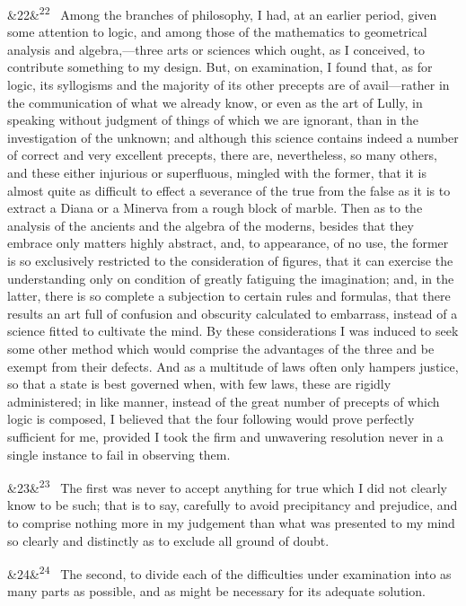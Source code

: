\documentclass[12pt]{article}
\newcommand{\para}[1][]{\par\noindent\ifx&#1&\else\textsuperscript{\footnotesize #1}~\fi}
\begin{document}
\para[22] Among the branches of philosophy, I had, at an earlier period, given some attention to logic, and among those of the mathematics to geometrical analysis and algebra,---three arts or sciences which ought, as I conceived, to contribute something to my design. But, on examination, I found that, as for logic, its syllogisms and the majority of its other precepts are of avail---rather in the communication of what we already know, or even as the art of Lully, in speaking without judgment of things of which we are ignorant, than in the investigation of the unknown; and although this science contains indeed a number of correct and very excellent precepts, there are, nevertheless, so many others, and these either injurious or superfluous, mingled with the former, that it is almost quite as difficult to effect a severance of the true from the false as it is to extract a Diana or a Minerva from a rough block of marble. Then as to the analysis of the ancients and the algebra of the moderns, besides that they embrace only matters highly abstract, and, to appearance, of no use, the former is so exclusively restricted to the consideration of figures, that it can exercise the understanding only on condition of greatly fatiguing the imagination; and, in the latter, there is so complete a subjection to certain rules and formulas, that there results an art full of confusion and obscurity calculated to embarrass, instead of a science fitted to cultivate the mind. By these considerations I was induced to seek some other method which would comprise the advantages of the three and be exempt from their defects. And as a multitude of laws often only hampers justice, so that a state is best governed when, with few laws, these are rigidly administered; in like manner, instead of the great number of precepts of which logic is composed, I believed that the four following would prove perfectly sufficient for me, provided I took the firm and unwavering resolution never in a single instance to fail in observing them.

\para[23] The first was never to accept anything for true which I did not clearly know to be such; that is to say, carefully to avoid precipitancy and prejudice, and to comprise nothing more in my judgement than what was presented to my mind so clearly and distinctly as to exclude all ground of doubt.

\para[24] The second, to divide each of the difficulties under examination into as many parts as possible, and as might be necessary for its adequate solution.
\end{document}
